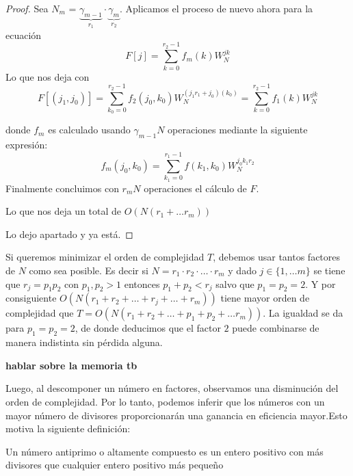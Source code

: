 \begin{proof}
\vspace{0.1cm}

Sea $N_m$ = $\underbrace{\gamma_{m-1}}_{r_1} \cdot \underbrace{\gamma_m}_{r_2}$.
Aplicamos el proceso de nuevo ahora para la ecuación 
\begin{equation}\label{eq:fft2}
   F[j] = \sum_{k=0}^{r_2-1}  f_m(k)W_N^{jk}  
\end{equation}
Lo que nos deja con 
\begin{equation}\label{eq:fft2}
    F[(j_1,j_0)] = \sum_{k_0=0}^{r_2-1}  f_2(j_0,k_0)W_N^{(j_1r_1+j_0)(k_0)} = \sum_{k=0}^{r_2-1}  f_1(k)W_N^{jk} 
\end{equation}

donde $f_m$ es calculado usando $\gamma_{m-1}N$ operaciones mediante la siguiente expresión: 
\begin{equation}\label{eq:fft1}
    f_m(j_0,k_0) = \sum_{k_1=0}^{r_1-1} f(k_1,k_0) W_N^{j_0k_1r_2}
\end{equation}
Finalmente concluimos con $r_mN$ operaciones el cálculo de $F$.

Lo que nos deja un total de $O(N(r_1+ \ldots r_m))$

Lo dejo apartado y ya está.





\end{proof}


\begin{observacion}
    Si queremos minimizar el orden de complejidad $T$, debemos usar tantos factores de $N$ como sea posible. Es decir si $N = r_1 \cdot r_2 \cdot \ldots \cdot r_m$ y dado $j \in \{1, \ldots m\}$ se tiene que $r_j = p_1p_2$ con $p_1,p_2>1$   entonces $p_1+p_2 < r_j$ salvo que  $p_1=p_2=2$.
    Y por consiguiente $O(N(r_1 + r_2 + \ldots + r_j + \ldots + r_m))$ tiene mayor orden de complejidad que $T=O(N(r_1 + r_2 + \ldots + p_1+p_2+ \ldots r_m))$.
    La igualdad se da  para $p_1=p_2=2$, de donde deducimos que el factor $2$ puede combinarse de manera indistinta sin pérdida alguna.
\end{observacion}


\textbf{hablar sobre la memoria tb}


\noindent Luego, al descomponer un número en factores, observamos una disminución del orden de complejidad. Por lo tanto, podemos inferir que los números con un mayor número de divisores proporcionarán una ganancia en eficiencia mayor.Esto motiva la siguiente definición:

\begin{definicion}
    Un número antiprimo o altamente compuesto es un entero positivo con más divisores que cualquier entero positivo más pequeño
\end{definicion}


